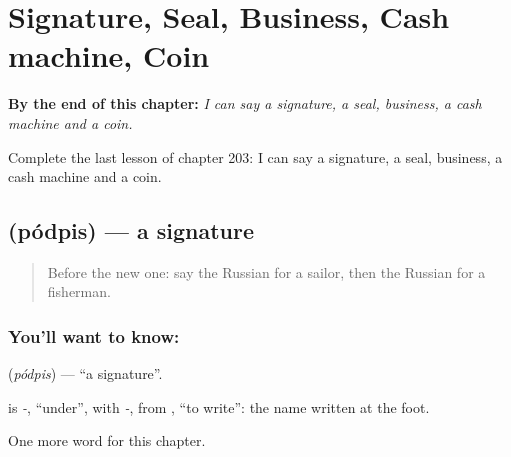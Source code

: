 
\chapter{Signature, Seal, Business, Cash machine, Coin}
\label{ch:ru-signature-seal-business-cash-machine-coin}

\begin{chapteropening}
\textbf{By the end of this chapter:} \emph{I can say a signature, a seal, business, a cash machine and a coin.}

Complete the last lesson of chapter 203: I can say a signature, a seal, business, a cash machine and a coin.
\end{chapteropening}

\section[\texorpdfstring{\ru{подпись} (pódpis)}{подпись (pódpis)}]{ (pódpis) — a signature}

\label{lesson:RU-C203-podpis}



\begin{quote}
Before the new one: say the Russian for a sailor, then the Russian for a fisherman.
\end{quote}

\subsection*{You'll want to know: }
\textbf{} (\emph{pódpis}) — \textquotedblleft{}a signature\textquotedblright{}.

\begin{cousinweb}
\textbf{} is \emph{-}, \textquotedblleft{}under\textquotedblright{}, with \emph{-}, from \emph{}, \textquotedblleft{}to write\textquotedblright{}: the name written at the foot.
\end{cousinweb}

\begin{grammarlens}[title={What you've built}]
One more word for this chapter.
\end{grammarlens}

